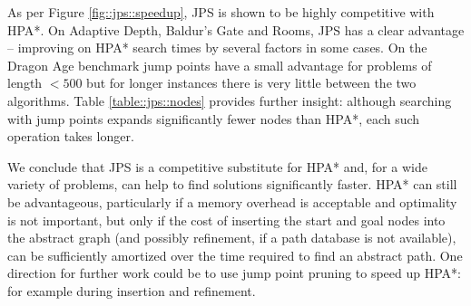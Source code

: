 As per Figure \ref{fig::jps::speedup}, JPS is shown to be highly competitive
with HPA{*}.  On Adaptive Depth, Baldur's Gate and Rooms, JPS has a clear
advantage -- improving on HPA{*} search times by several factors in some cases.
On the Dragon Age benchmark jump points have a small advantage for problems of
length $< 500$ but for longer instances there is very little between the two
algorithms.  Table \ref{table::jps::nodes} provides further insight: although
searching with jump points expands significantly fewer nodes than HPA{*}, each
such operation takes longer.

We conclude that JPS is a competitive substitute for HPA{*} and, for a wide
variety of problems, can help to find solutions significantly faster.  HPA{*}
can still be advantageous, particularly if a memory overhead is acceptable and
optimality is not important, but only if the cost of inserting the start and
goal nodes into the abstract graph (and possibly refinement, if a path
database is not available), can be sufficiently amortized over the time
required to find an abstract path.  One direction for further work could be to
use jump point pruning to speed up HPA{*}: for example during insertion and
refinement.

